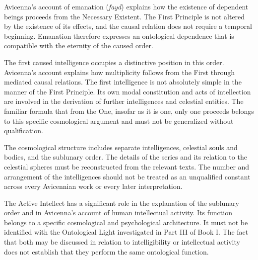 \label{para:VS.B01.P01.C08.S13.SS11.P001}

Avicenna's account of
emanation (\textit{fayd})
explains how the existence
of dependent beings
proceeds from the
Necessary Existent.
The First Principle
is not altered by
the existence of its
effects, and the
causal relation does
not require a temporal
beginning. Emanation
therefore expresses
an ontological dependence
that is compatible
with the eternity
of the caused order.
\citep[Ilahiyyat, IX.1--4]{AvicennaMetaphysics}

\label{para:VS.B01.P01.C08.S13.SS11.P002}

The first caused intelligence
occupies a distinctive
position in this order.
Avicenna's account explains
how multiplicity follows
from the First through
mediated causal relations.
The first intelligence
is not absolutely simple
in the manner of the
First Principle. Its
own modal constitution
and acts of intellection
are involved in the
derivation of further
intelligences and
celestial entities.
The familiar formula
that from the One,
insofar as it is one,
only one proceeds
belongs to this
specific cosmological
argument and must
not be generalized
without qualification.
\citep[Ilahiyyat, IX.4--5]{AvicennaMetaphysics}

\label{para:VS.B01.P01.C08.S13.SS11.P003}

The cosmological structure
includes separate intelligences,
celestial souls and
bodies, and the
sublunary order.
The details of the
series and its relation
to the celestial spheres
must be reconstructed
from the relevant
texts. The number
and arrangement of
the intelligences
should not be treated
as an unqualified
constant across every
Avicennian work or
every later interpretation.
\citep[Ilahiyyat, IX.3--5]{AvicennaMetaphysics}

\label{para:VS.B01.P01.C08.S13.SS11.P004}

The Active Intellect
has a significant
role in the explanation
of the sublunary
order and in Avicenna's
account of human
intellectual activity.
Its function belongs
to a specific cosmological
and psychological
architecture. It must
not be identified
with the Ontological
Light investigated
in Part III of Book I.
The fact that both
may be discussed
in relation to
intelligibility or
intellectual activity
does not establish
that they perform
the same ontological
function.
\citep[Ilahiyyat, IX.5 and X.1]{AvicennaMetaphysics}

